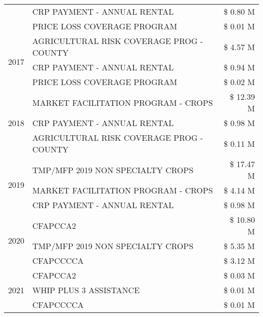 \begin{tabular}{llr}
 & CRP PAYMENT - ANNUAL RENTAL                   & \$ 0.80 M \\
 & PRICE LOSS COVERAGE PROGRAM                   & \$ 0.01 M \\
\cline{1-3}
\multirow[t]{3}{*}{2017} & AGRICULTURAL RISK COVERAGE PROG - COUNTY & \$ 4.57 M \\
 & CRP PAYMENT - ANNUAL RENTAL & \$ 0.94 M \\
 & PRICE LOSS COVERAGE PROGRAM & \$ 0.02 M \\
\cline{1-3}
\multirow[t]{3}{*}{2018} & MARKET FACILITATION PROGRAM - CROPS & \$ 12.39 M \\
 & CRP PAYMENT - ANNUAL RENTAL & \$ 0.98 M \\
 & AGRICULTURAL RISK COVERAGE PROG - COUNTY & \$ 0.11 M \\
\cline{1-3}
\multirow[t]{3}{*}{2019} & TMP/MFP 2019 NON SPECIALTY CROPS & \$ 17.47 M \\
 & MARKET FACILITATION PROGRAM - CROPS & \$ 4.14 M \\
 & CRP PAYMENT - ANNUAL RENTAL & \$ 0.98 M \\
\cline{1-3}
\multirow[t]{3}{*}{2020} & CFAPCCA2 & \$ 10.80 M \\
 & TMP/MFP 2019 NON SPECIALTY CROPS & \$ 5.35 M \\
 & CFAPCCCCA & \$ 3.12 M \\
\cline{1-3}
\multirow[t]{3}{*}{2021} & CFAPCCA2 & \$ 0.03 M \\
 & WHIP PLUS 3 ASSISTANCE & \$ 0.01 M \\
 & CFAPCCCCA & \$ 0.01 M \\
\cline{1-3}
\bottomrule
\end{tabular}
